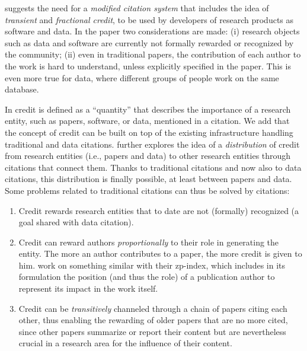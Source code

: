 \citet{transitiveCreditKatz2014} suggests the need for a \emph{modified citation system} that includes the idea of \emph{transient} and \emph{fractional credit}, to be used by developers of research products as software and data.
In the paper two considerations are made: (i) research objects such as data and software are currently not formally rewarded or recognized by the community; 
(ii) even in traditional papers, the contribution of each author to the work is hard to understand, unless explicitly specified in the paper. 
This is even more true for data, where different groups of people work on the same database.

In \citep{transitiveCreditKatz2014} credit is defined as a ``quantity'' that describes the importance of a research entity, such as papers, software, or data, mentioned in a citation. 
We add that the concept of credit can be built on top of the existing infrastructure handling traditional and data citations.
\citet{transitiveCreditKatz2014} further explores the idea of a \emph{distribution} of credit from research entities (i.e., papers and data) to other research entities through citations that connect them. 
Thanks to traditional citations and now also to data citations, this distribution is finally possible, at least between papers and data. 
Some problems related to traditional citations can thus be solved by citations:

\begin{enumerate}
\item Credit rewards research entities that to date are not (formally) recognized (a goal shared with data citation).
\item Credit can reward authors \emph{proportionally} to their role in generating the entity. The more an author contributes to a paper, the more credit is given to him. \citet{ZouP16} work on something similar with their zp-index, which includes in its formulation the position (and thus the role) of a publication author to represent its impact in the work itself.
\item Credit can be \emph{transitively} channeled through a chain of papers citing each other, thus enabling the rewarding of older papers that are no more cited, since other papers summarize or report their content 
but are nevertheless crucial in a research area for the influence of their content.
\end{enumerate}

